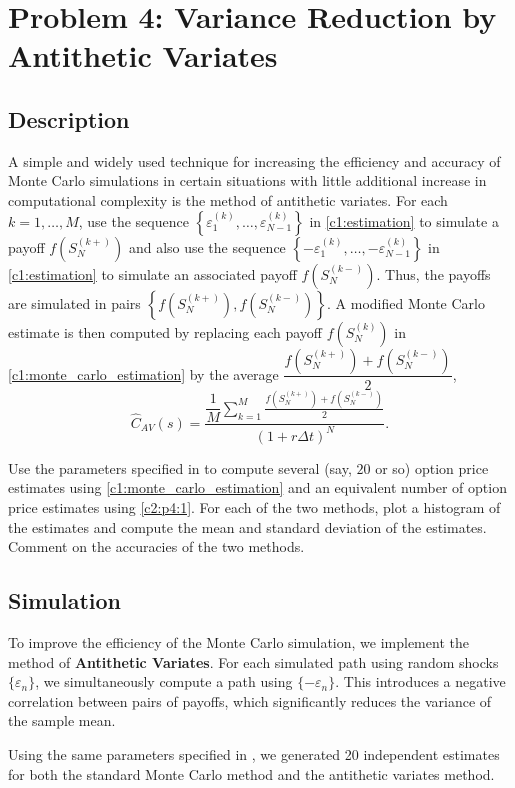 \section{Problem 4: Variance Reduction by Antithetic Variates}
\subsection{Description}
A simple and widely used technique for increasing the efficiency and accuracy of Monte Carlo simulations in certain situations with little additional increase in computational complexity is the method of antithetic variates. For each $k = 1, \dots, M$, use the sequence $\left\{ \varepsilon_1^{(k)}, \dots, \varepsilon_{N-1}^{(k)} \right\}$ in \eqref{c1:estimation} to simulate a payoff $f(S_N^{(k+)})$ and also use the sequence $\left\{ -\varepsilon_1^{(k)}, \dots, -\varepsilon_{N-1}^{(k)} \right\}$ in \eqref{c1:estimation} to simulate an associated payoff $f(S_N^{(k-)})$. Thus, the payoffs are simulated in pairs $\left\{ f(S_N^{(k+)}), f(S_N^{(k-)}) \right\}$. A modified Monte Carlo estimate is then computed by replacing each payoff $f(S_N^{(k)})$ in \eqref{c1:monte_carlo_estimation} by the average $\dfrac{f(S_N^{(k+)}) + f(S_N^{(k-)})}{2}$,
\begin{equation}
	\hat{C}_{AV}(s) = \frac{\dfrac{1}{M} \displaystyle\sum_{k=1}^M \frac{f(S_N^{(k+)}) + f(S_N^{(k-)})}{2}}{(1 + r \Delta t)^N}.
	\label{c2:p4:1}
\end{equation}

Use the parameters specified in  to compute several (say, $20$ or so) option price estimates using \eqref{c1:monte_carlo_estimation} and an equivalent number of option price estimates using \eqref{c2:p4:1}. For each of the two methods, plot a histogram of the estimates and compute the mean and standard deviation of the estimates. Comment on the accuracies of the two methods.

\subsection{Simulation}
To improve the efficiency of the Monte Carlo simulation, we implement the method of \textbf{Antithetic Variates}. For each simulated path using random shocks $\{\varepsilon_n\}$, we simultaneously compute a path using $\{-\varepsilon_n\}$. This introduces a negative correlation between pairs of payoffs, which significantly reduces the variance of the sample mean.

Using the same parameters specified in , we generated 20 independent estimates for both the standard Monte Carlo method and the antithetic variates method.

